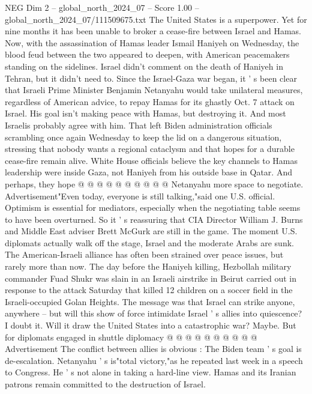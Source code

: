 \begin{textsample}{NEG Dim 2 – global\_north\_2024\_07 – Score 1.00 – global\_north\_2024\_07/111509675.txt}  \label{ex:f2_neg_067}
The United States is a superpower.
Yet for nine months it has been unable to broker a cease-fire between Israel and Hamas.
Now, with the assassination of Hamas leader Ismail Haniyeh on Wednesday, the blood feud between the two appeared to deepen, with American peacemakers standing on the sidelines.
Israel didn't comment on the death of Haniyeh in Tehran, but it didn't need to.
Since the Israel-Gaza war began, it ' s been clear that Israeli Prime Minister Benjamin Netanyahu would take unilateral measures, regardless of American advice, to repay Hamas for its ghastly Oct. 7 attack on Israel.
His goal isn't making peace with Hamas, but destroying it.
And most Israelis probably agree with him.
That left Biden administration officials scrambling once again Wednesday to keep the lid on a dangerous situation, stressing that nobody wants a regional cataclysm and that hopes for a durable cease-fire remain alive.
White House officials believe the key channels to Hamas leadership were inside Gaza, not Haniyeh from his outside base in Qatar.
And perhaps, they hope @ @ @ @ @ @ @ @ @ @ Netanyahu more space to negotiate.
Advertisement"Even today, everyone is still talking,"said one U.S. official.
Optimism is essential for mediators, especially when the negotiating table seems to have been overturned.
So it ' s reassuring that CIA Director William J.
Burns and Middle East adviser Brett McGurk are still in the game.
The moment U.S. diplomats actually walk off the stage, Israel and the moderate Arabs are sunk.
The American-Israeli alliance has often been strained over peace issues, but rarely more than now.
The day before the Haniyeh killing, Hezbollah military commander Fuad Shukr was slain in an Israeli airstrike in Beirut carried out in response to the attack Saturday that killed 12 children on a soccer field in the Israeli-occupied Golan Heights.
The message was that Israel can strike anyone, anywhere -- but will this show of force intimidate Israel ' s allies into quiescence?
I doubt it.
Will it draw the United States into a catastrophic war?
Maybe.
But for diplomats engaged in shuttle diplomacy @ @ @ @ @ @ @ @ @ @ Advertisement The conflict between allies is obvious : The Biden team ' s goal is de-escalation.
Netanyahu ' s is"total victory,"as he repeated last week in a speech to Congress.
He ' s not alone in taking a hard-line view.
Hamas and its Iranian patrons remain committed to the destruction of Israel.

\end{textsample}
